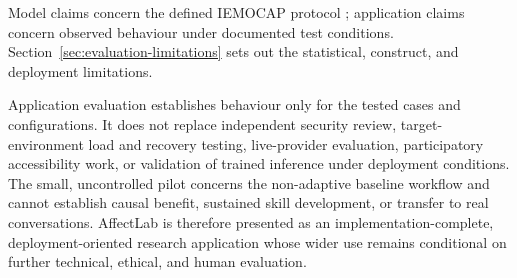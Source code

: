 Model claims concern the defined IEMOCAP protocol \cite{busso2008iemocap}; application claims concern observed behaviour under documented test conditions. Section~\ref{sec:evaluation-limitations} sets out the statistical, construct, and deployment limitations.

Application evaluation establishes behaviour only for the tested cases and configurations. It does not replace independent security review, target-environment load and recovery testing, live-provider evaluation, participatory accessibility work, or validation of trained inference under deployment conditions. The small, uncontrolled pilot concerns the non-adaptive baseline workflow and cannot establish causal benefit, sustained skill development, or transfer to real conversations. AffectLab is therefore presented as an implementation-complete, deployment-oriented research application whose wider use remains conditional on further technical, ethical, and human evaluation.
